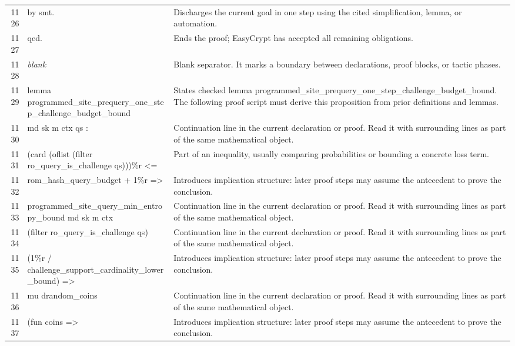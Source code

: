 \documentclass[10pt]{article}
\begin{document}
\begin{longtable}{r L{0.53\textwidth} L{0.37\textwidth}}
1126 & {\ttfamily\scriptsize by smt.} & Discharges the current goal in one step using the cited simplification, lemma, or automation. \\
1127 & {\ttfamily\scriptsize qed.} & Ends the proof; EasyCrypt has accepted all remaining obligations. \\
1128 & {\ttfamily\scriptsize \emph{blank}} & Blank separator.  It marks a boundary between declarations, proof blocks, or tactic phases. \\
1129 & {\ttfamily\scriptsize lemma programmed\_site\_prequery\_one\_step\_challenge\_budget\_bound} & States checked lemma programmed\_site\_prequery\_one\_step\_challenge\_budget\_bound.  The following proof script must derive this proposition from prior definitions and lemmas. \\
1130 & {\ttfamily\scriptsize   md sk m ctx qs :} & Continuation line in the current declaration or proof.  Read it with surrounding lines as part of the same mathematical object. \\
1131 & {\ttfamily\scriptsize   (card (oflist (filter ro\_query\_is\_challenge qs)))\%r <=} & Part of an inequality, usually comparing probabilities or bounding a concrete loss term. \\
1132 & {\ttfamily\scriptsize     rom\_hash\_query\_budget + 1\%r =>} & Introduces implication structure: later proof steps may assume the antecedent to prove the conclusion. \\
1133 & {\ttfamily\scriptsize   programmed\_site\_query\_min\_entropy\_bound md sk m ctx} & Continuation line in the current declaration or proof.  Read it with surrounding lines as part of the same mathematical object. \\
1134 & {\ttfamily\scriptsize     (filter ro\_query\_is\_challenge qs)} & Continuation line in the current declaration or proof.  Read it with surrounding lines as part of the same mathematical object. \\
1135 & {\ttfamily\scriptsize     (1\%r / challenge\_support\_cardinality\_lower\_bound) =>} & Introduces implication structure: later proof steps may assume the antecedent to prove the conclusion. \\
1136 & {\ttfamily\scriptsize   mu drandom\_coins} & Continuation line in the current declaration or proof.  Read it with surrounding lines as part of the same mathematical object. \\
1137 & {\ttfamily\scriptsize     (fun coins =>} & Introduces implication structure: later proof steps may assume the antecedent to prove the conclusion. \\

\end{longtable}
\end{document}
